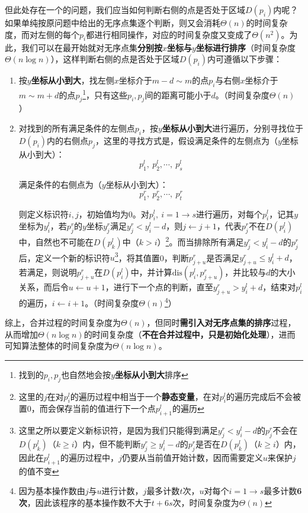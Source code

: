 \documentclass[12pt,a4paper,violet,oneside]{bbe}
\begin{document}
但此处存在一个的问题，我们应当如何判断右侧的点是否处于区域$D(p_i)$内呢？如果单纯按原问题中给出的无序点集逐个判断，则又会消耗$\Theta(n)$的时间复杂度，而对左侧的每个$p_i$都进行相同操作，对应的时间复杂度又变成了$\Theta(n^2)$。为此，我们可以在最开始就对无序点集\textbf{分别按$x$坐标与$y$坐标进行排序}（时间复杂度$\Theta(n\log n)$），这样判断右侧的点是否处于区域$D(p_i)$内可遵循以下步骤：
\begin{enumerate}
	\item 按\textbf{$y$坐标从小到大}，找左侧$x$坐标介于$m-d\sim m$的点$p_i$与右侧$x$坐标介于$m\sim m+d$的点$p_j$\footnote{找到的$p_i,p_j$也自然地会按\textbf{$y$坐标从小到大}排序}，只有这些$p_i,p_j$间的距离可能小于$d$。（时间复杂度$\Theta(n)$）
	\item 对找到的所有满足条件的左侧点$p_i$，按\textbf{$y$坐标从小到大}进行遍历，分别寻找位于$D(p_i)$内的右侧点$p_j$，这里的寻找方式是，假设满足条件的左侧点为（$y$坐标从小到大）：
	$$
	p^l_1,~p^l_2,\cdots,~p^l_s
	$$
	
	满足条件的右侧点为（$y$坐标从小到大）：
	$$
	p^r_1,~p^r_2,\cdots,~p^r_t
	$$
	
	则定义标识符$i,j$，初始值均为0。对$p^l_i,~i=1\to s$进行遍历，对每个$p^l_i$，记其$y$坐标为$y^l_i$，若$p^r_j$的$y$坐标$y^r_j$满足$y^r_j<y^l_i-d$，则$j\leftarrow j+1$，代表$p^r_j$不在$D(p^l_i)$中，自然也不可能在$D(p^l_k)$中（$k>i$）\footnote{这里的$j$在对$p^l_i$的遍历过程中相当于一个\textbf{静态变量}，在对$p^l_i$的遍历完成后不会被置0，而会保存当前的值进行下一个点$p^l_{i+1}$的遍历}。而当排除所有满足$y^r_j<y^l_i-d$的$p^r_j$后，定义一个新的标识符$u$\footnote{这里之所以要定义新标识符，是因为我们只能得到满足$y^r_j<y^l_i-d$的$p^r_j$不会在$D(p^l_k)$（$k\geqslant i$）内，但不能判断$y^r_j\geqslant y^l_i-d$的$p^r_j$是否在$D(p^l_k)$（$k\geqslant i$）内，因此在$p^l_{i+1}$的遍历过程中，$j$仍要从当前值开始计数，因而需要定义$u$来保护$j$的值不变}，将其值置0，判断$p^r_{j+u}$是否满足$y^r_{j+u}\leqslant y^l_i+d$，若满足，则说明$p^r_{j+u}$在$D(p^l_i)$中，并计算$\text{dis}(p^l_i,p^r_{j+u})$，并比较与$d$的大小关系，而后令$u\leftarrow u+1$，进行下一个点的判断，直至$y^r_{j+u}>y^l_i+d$，结束对$p^l_i$的遍历，$i\leftarrow i+1$。（时间复杂度$\Theta(n)$\footnote{因为基本操作数由$j$与$u$进行计数，$j$最多计数$t$次，$u$对每个$i=1\to s$最多计数\textbf{6次}，因此该程序的基本操作数不大于$t+6s$次，时间复杂度为$\Theta(n)$}）
\end{enumerate}

综上，合并过程的时间复杂度为$\Theta(n)$，但同时\textbf{需引入对无序点集的排序}过程，从而增加$\Theta(n\log n)$的时间复杂度（\textbf{不在合并过程中，只是初始化处理}），进而可知算法整体的时间复杂度为$\Theta(n\log n)$。
\end{document}

